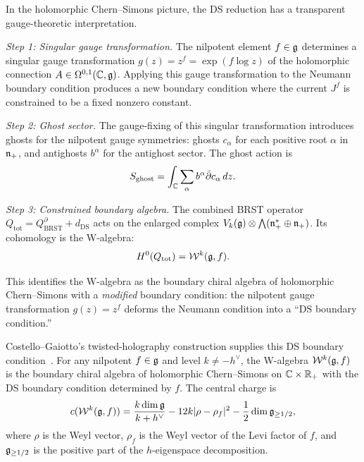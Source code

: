 \begin{construction}
In the holomorphic Chern--Simons picture, the DS reduction has a
transparent gauge-theoretic interpretation.

\emph{Step 1: Singular gauge transformation.} The nilpotent element
$f \in \mathfrak{g}$ determines a singular gauge transformation
$g(z) = z^f = \exp(f \log z)$ of the holomorphic connection
$A \in \Omega^{0,1}(\mathbb{C}, \mathfrak{g})$. Applying this gauge transformation to
the Neumann boundary condition produces a new boundary condition where
the current $J^f$ is constrained to be a fixed nonzero constant.

\emph{Step 2: Ghost sector.} The gauge-fixing of this singular
transformation introduces ghosts for the nilpotent gauge symmetries:
ghosts $c_\alpha$ for each positive root $\alpha$ in $\mathfrak{n}_+$, and
antighosts $b^\alpha$ for the antighost sector. The ghost action is
\[
S_{\mathrm{ghost}} = \int_{\mathbb{C}} \sum_\alpha b^\alpha \bar{\partial} c_\alpha \, dz.
\]

\emph{Step 3: Constrained boundary algebra.} The combined BRST
operator $Q_{\mathrm{tot}} = Q_{\mathrm{BRST}}^\partial + d_{\mathrm{DS}}$
acts on the enlarged complex $V_k(\mathfrak{g}) \otimes \bigwedge(\mathfrak{n}_+^* \oplus \mathfrak{n}_+)$.
Its cohomology is the W-algebra:
\[
H^0(Q_{\mathrm{tot}}) = \mathcal{W}^k(\mathfrak{g}, f).
\]

This identifies the W-algebra as the boundary chiral algebra of
holomorphic Chern--Simons with a \emph{modified} boundary condition:
the nilpotent gauge transformation $g(z) = z^f$ deforms the Neumann
condition into a ``DS boundary condition.''
\end{construction}

\begin{theorem}
Costello--Gaiotto's twisted-holography construction supplies this
DS boundary condition~\cite{costello-gaiotto}. For any nilpotent
$f \in \mathfrak{g}$ and level $k \neq -h^\vee$, the W-algebra
$\mathcal{W}^k(\mathfrak{g}, f)$ is the boundary chiral algebra of holomorphic
Chern--Simons on $\mathbb{C} \times \mathbb{R}_+$ with the DS boundary condition
determined by $f$. The central charge is
\[
c(\mathcal{W}^k(\mathfrak{g}, f))
 = \frac{k \dim \mathfrak{g}}{k + h^\vee}
 - 12 k |\rho - \rho_f|^2
 - \frac{1}{2} \dim \mathfrak{g}_{\geq 1/2},
\]
where $\rho$ is the Weyl vector, $\rho_f$ is the Weyl vector of the
Levi factor of $f$, and $\mathfrak{g}_{\geq 1/2}$ is the positive part of the
$h$-eigenspace decomposition.
\end{theorem}

